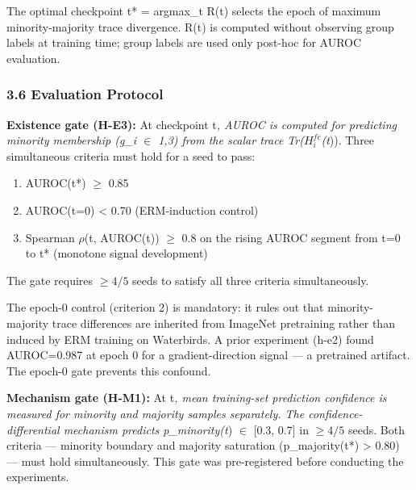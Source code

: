 The optimal checkpoint t* = argmax\_t R(t) selects the epoch of maximum minority-majority trace divergence. R(t) is computed without observing group labels at training time; group labels are used only post-hoc for AUROC evaluation.

\subsubsection{3.6 Evaluation Protocol}

\textbf{Existence gate (H-E3):} At checkpoint t\textit{, AUROC is computed for predicting minority membership (g\_i $\in$ {1,3}) from the scalar trace Tr($H_i^{fc}$(t})). Three simultaneous criteria must hold for a seed to pass:

\begin{enumerate}
\item AUROC(t*) $\geq$ 0.85
\item AUROC(t=0) < 0.70 (ERM-induction control)
\item Spearman $\rho$(t, AUROC(t)) $\geq$ 0.8 on the rising AUROC segment from t=0 to t* (monotone signal development)
\end{enumerate}

The gate requires $\geq 4/5$ seeds to satisfy all three criteria simultaneously.

The epoch-0 control (criterion 2) is mandatory: it rules out that minority-majority trace differences are inherited from ImageNet pretraining rather than induced by ERM training on Waterbirds. A prior experiment (h-e2) found AUROC=0.987 at epoch 0 for a gradient-direction signal --- a pretrained artifact. The epoch-0 gate prevents this confound.

\textbf{Mechanism gate (H-M1):} At t\textit{, mean training-set prediction confidence is measured for minority and majority samples separately. The confidence-differential mechanism predicts p\_minority(t}) $\in$ [0.3, 0.7] in $\geq 4/5$ seeds. Both criteria --- minority boundary and majority saturation (p\_majority(t*) > 0.80) --- must hold simultaneously. This gate was pre-registered before conducting the experiments.
